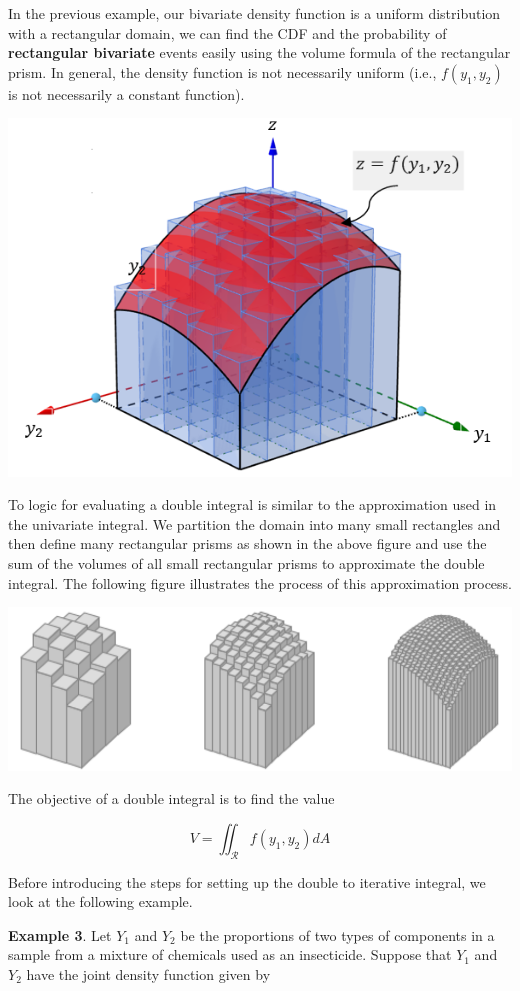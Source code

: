 \documentclass[
]{book}
\begin{document}
In the previous example, our bivariate density function is a uniform distribution with a rectangular domain, we can find the CDF and the probability of \textbf{rectangular bivariate} events easily using the volume formula of the rectangular prism. In general, the density function is not necessarily uniform (i.e., \(f(y_1, y_2)\) is not necessarily a constant function).

\begin{center}\includegraphics[width=0.5\linewidth]{topic06/doubleIntegralDemo01} \end{center}

To logic for evaluating a double integral is similar to the approximation used in the univariate integral. We partition the domain into many small rectangles and then define many rectangular prisms as shown in the above figure and use the sum of the volumes of all small rectangular prisms to approximate the double integral. The following figure illustrates the process of this approximation process.

\begin{center}\includegraphics[width=0.9\linewidth]{topic06/doubleIntegralDemo02} \end{center}

The objective of a double integral is to find the value

\[
V = \iint_{\mathcal{R}} f(y_1, y_2)dA
\]

Before introducing the steps for setting up the double to iterative integral, we look at the following example.

\textbf{Example 3}. Let \(Y_1\) and \(Y_2\) be the proportions of two types of components in a sample from a mixture of chemicals used as an insecticide. Suppose that \(Y_1\) and \(Y_2\) have the joint density function given by
\end{document}
